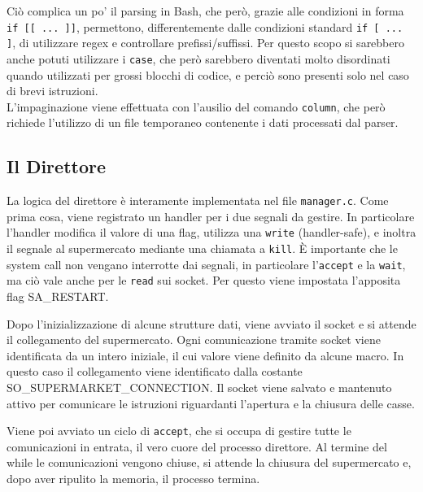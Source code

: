 \documentclass[a4paper,11pt] {article}
\begin{document}


Ciò complica un po' il parsing in Bash, che però, grazie alle condizioni in forma \lstinline{if [[ ... ]]}, permettono, differentemente dalle condizioni standard \lstinline{if [ ... ]}, di utilizzare regex e controllare prefissi/suffissi. Per questo scopo si sarebbero anche potuti utilizzare i \lstinline{case}, che però sarebbero diventati molto disordinati quando utilizzati per grossi blocchi di codice, e perciò sono presenti solo nel caso di brevi istruzioni.\\
L'impaginazione viene effettuata con l'ausilio del comando \lstinline{column}, che però richiede l'utilizzo di un file temporaneo contenente i dati processati dal parser.

\subsection*{Il Direttore}

La logica del direttore è interamente implementata nel file \lstinline{manager.c}. Come prima cosa, viene registrato un handler per i due segnali da gestire. In particolare l'handler modifica il valore di una flag, utilizza una \lstinline{write} (handler-safe), e inoltra il segnale al supermercato mediante una chiamata a \lstinline{kill}. È importante che le system call non vengano interrotte dai segnali, in particolare l'\lstinline{accept} e la \lstinline{wait}, ma ciò vale anche per le \lstinline{read} sui socket. Per questo viene impostata l'apposita flag SA\_RESTART.

Dopo l'inizializzazione di alcune strutture dati, viene avviato il socket e si attende il collegamento del supermercato. Ogni comunicazione tramite socket viene identificata da un intero iniziale, il cui valore viene definito da alcune macro. In questo caso il collegamento viene identificato dalla costante SO\_SUPERMARKET\_CONNECTION. Il socket viene salvato e mantenuto attivo per comunicare le istruzioni riguardanti l'apertura e la chiusura delle casse.

Viene poi avviato un ciclo di \lstinline{accept}, che si occupa di gestire tutte le comunicazioni in entrata, il vero cuore del processo direttore. Al termine del while le comunicazioni vengono chiuse, si attende la chiusura del supermercato e, dopo aver ripulito la memoria, il processo termina.
\end{document}
